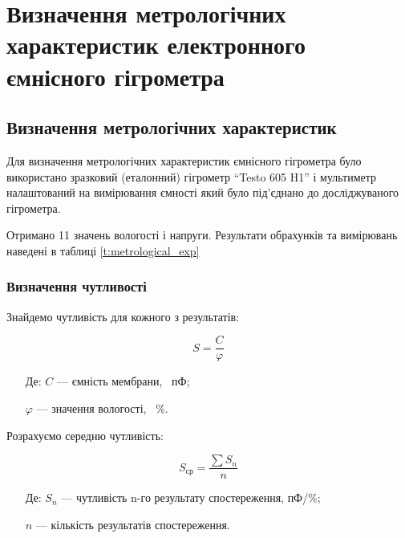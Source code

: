 \chapter{Визначення метрологічних характеристик електронного ємнісного гігрометра}
\section{Визначення метрологічних характеристик}

Для визначення метрологічних характеристик ємнісного гігрометра було використано
зразковий (еталонний) гігрометр ``Testo 605 H1'' і мультиметр налаштований на вимірювання ємності який
було під’єднано до досліджуваного гігрометра.

Отримано 11 значень вологості і напруги. Результати обрахунків та вимірювань наведені в таблиці \ref{t:metrological_exp}



\subsection{Визначення чутливості}

Знайдемо чутливість для кожного з результатів:

\begin{equation}
  S = \frac{C}{\varphi}
\end{equation}

\begin{itemize}
\item [Де:] $C$ --- ємність мембрани, ~пФ;
\item []$\varphi$ ---  значення вологості, ~\%.
\end{itemize}



 Розрахуємо середню чутливість:

 \begin{equation}
   S_{\text{ср}} = \frac{\sum S_n}{n}
 \end{equation}

 \begin{itemize}
 \item [Де:] $S_n$ --- чутливість n-го результату спостереження, пФ/\%;
 \item []$n$ ---  кількість результатів спостереження.
 \end{itemize}

 


